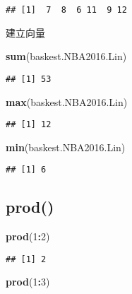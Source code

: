 \documentclass[]{article}
\newenvironment{Shaded}{\begin{snugshade}}{\end{snugshade}}
\newcommand{\DecValTok}[1]{\textcolor[rgb]{0.00,0.00,0.81}{#1}}
\newcommand{\KeywordTok}[1]{\textcolor[rgb]{0.13,0.29,0.53}{\textbf{#1}}}
\newcommand{\NormalTok}[1]{#1}
\newcommand{\OperatorTok}[1]{\textcolor[rgb]{0.81,0.36,0.00}{\textbf{#1}}}
\begin{document}
\begin{verbatim}
## [1]  7  8  6 11  9 12
\end{verbatim}

建立向量

\begin{Shaded}
\begin{Highlighting}[]
\KeywordTok{sum}\NormalTok{(baskest.NBA2016.Lin)}
\end{Highlighting}
\end{Shaded}

\begin{verbatim}
## [1] 53
\end{verbatim}

\begin{Shaded}
\begin{Highlighting}[]
\KeywordTok{max}\NormalTok{(baskest.NBA2016.Lin)}
\end{Highlighting}
\end{Shaded}

\begin{verbatim}
## [1] 12
\end{verbatim}

\begin{Shaded}
\begin{Highlighting}[]
\KeywordTok{min}\NormalTok{(baskest.NBA2016.Lin)}
\end{Highlighting}
\end{Shaded}

\begin{verbatim}
## [1] 6
\end{verbatim}

\hypertarget{prod}{%
\subsection{prod()}\label{prod}}

\begin{Shaded}
\begin{Highlighting}[]
\KeywordTok{prod}\NormalTok{(}\DecValTok{1}\OperatorTok{:}\DecValTok{2}\NormalTok{)}
\end{Highlighting}
\end{Shaded}

\begin{verbatim}
## [1] 2
\end{verbatim}

\begin{Shaded}
\begin{Highlighting}[]
\KeywordTok{prod}\NormalTok{(}\DecValTok{1}\OperatorTok{:}\DecValTok{3}\NormalTok{)}
\end{Highlighting}
\end{Shaded}
\end{document}
